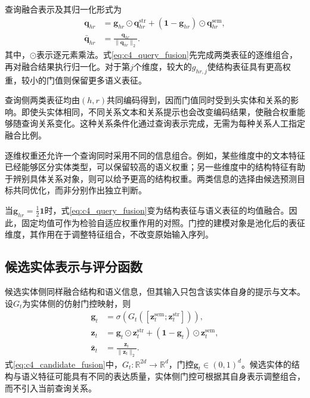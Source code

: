 查询融合表示及其归一化形式为
\begin{equation}
\begin{aligned}
    \mathbf{q}_{hr}&=\mathbf{g}_{hr}\odot\mathbf{q}_{hr}^{\mathrm{str}}
        +(\mathbf{1}-\mathbf{g}_{hr})\odot\mathbf{q}_{hr}^{\mathrm{sem}},\\
    \bar{\mathbf{q}}_{hr}&=\frac{\mathbf{q}_{hr}}{\|\mathbf{q}_{hr}\|_2}.
\end{aligned}
    \label{eq:c4_query_fusion}
\end{equation}
其中，$\odot$表示逐元素乘法。式\eqref{eq:c4_query_fusion}先完成两类表征的逐维组合，再对融合结果执行归一化。对于第$j$个维度，较大的$g_{hr,j}$使结构表征具有更高权重，较小的门值则保留更多语义表征。

查询侧两类表征均由$(h,r)$共同编码得到，因而门值同时受到头实体和关系的影响。即使头实体相同，不同关系文本和关系提示也会改变编码结果，使融合权重能够随查询关系变化。这种关系条件化通过查询表示完成，无需为每种关系人工指定融合比例。

逐维权重还允许一个查询同时采用不同的信息组合。例如，某些维度中的文本特征已经能够区分实体类型，可以保留较高的语义权重；另一些维度中的结构特征有助于辨别具体关系对象，则可以给予更高的结构权重。两类信息的选择由候选预测目标共同优化，而非分别作出独立判断。

当$\mathbf{g}_{hr}=\tfrac12\mathbf{1}$时，式\eqref{eq:c4_query_fusion}变为结构表征与语义表征的均值融合。因此，固定均值可作为检验自适应权重作用的对照。门控的建模对象是池化后的表征维度，其作用在于调整特征组合，不改变原始输入序列。

\subsection{候选实体表示与评分函数}

候选实体侧同样融合结构和语义信息，但其输入只包含该实体自身的提示与文本。设$G_t$为实体侧的仿射门控映射，则
\begin{equation}
\begin{aligned}
    \mathbf{g}_t&=\sigma\!\left(G_t([\mathbf{z}_{t}^{\mathrm{sem}};\mathbf{z}_{t}^{\mathrm{str}}])\right),\\
    \mathbf{z}_t&=\mathbf{g}_t\odot\mathbf{z}_{t}^{\mathrm{str}}
       +(\mathbf{1}-\mathbf{g}_t)\odot\mathbf{z}_{t}^{\mathrm{sem}},\\
    \bar{\mathbf{z}}_t&=\frac{\mathbf{z}_t}{\|\mathbf{z}_t\|_2}.
\end{aligned}
    \label{eq:c4_candidate_fusion}
\end{equation}
式\eqref{eq:c4_candidate_fusion}中，$G_t:\mathbb{R}^{2d}\rightarrow\mathbb{R}^{d}$，门控$\mathbf{g}_t\in(0,1)^d$。候选实体的结构与语义特征可能具有不同的表达质量，实体侧门控可根据其自身表示调整组合，而不引入当前查询关系。

